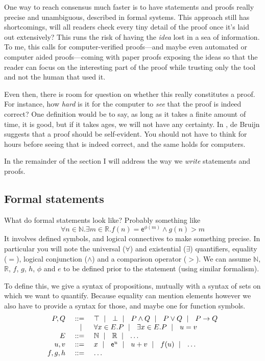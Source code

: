 One way to reach consensus much faster is to have statements and proofs really
precise and unambiguous, described in formal systems. This approach still has
shortcomings, will all readers check every tiny detail of the proof once it's
laid out extensively? This runs the risk of having the \emph{idea} lost in a
sea of information.
To me, this calls for computer-verified proofs---and maybe even automated or
computer aided proofs---coming with paper proofs exposing the ideas
so that the reader can focus on the interesting part of
the proof while trusting only the tool and not the human that used it.

Even then, there is room for question on whether this really constitutes a
proof.
For instance, how \emph{hard} is it for the computer to \emph{see} that the
proof is indeed correct? One definition would be to say, as long as it takes
a finite amount of time, it is good, but if it takes ages, we will not have any
certainty. In , de Bruijn suggests that a proof should be
self-evident. You should not have to think for hours before seeing that is
indeed correct, and the same holds for computers.

In the remainder of the section I will address the way we \emph{write}
statements and proofs.

\subsection{Formal statements}

What do formal statements look like? Probably something like
\[
  \forall n \in \mathbb{N}. \exists m \in \mathbb{R}.
  f(n) = \mathsf{e}^{\phi(m)} \wedge g(n) > m
\]
It involves defined symbols, and logical connectives to make something precise.
In particular you will note the universal (\(\forall\)) and existential
(\(\exists\)) quantifiers, equality (\(=\)), logical conjunction (\(\wedge\))
and a comparison operator (\(>\)).
We can assume \(\mathbb{N}\), \(\mathbb{R}\), \(f\), \(g\), \(h\), \(\phi\) and
\(e\) to be defined prior to the statement (using similar formalism).

To define this, we give a syntax of propositions, mutually with a syntax of
sets on which we want to quantify. Because equality can mention elements however
we also have to provide a syntax for those, and maybe one for function symbols.
\[
  \begin{array}{rrl}
    P, Q &\ \mathrel{{:}{:}{=}}\ & \top \ \mid\ \  \bot \ \mid\ \  P \wedge Q \ \mid\ \  P \vee Q
    \ \mid\ \  P \to Q \\
    &\ \mid\ \ & \forall x \in E. P \ \mid\ \  \exists x \in E. P \ \mid\ \  u = v \\
    E &\ \mathrel{{:}{:}{=}}\ & \mathbb{N} \ \mid\ \  \mathbb{R} \ \mid\ \  \dots \\
    u, v &\ \mathrel{{:}{:}{=}}\ & x \ \mid\ \  \mathsf{e}^u \ \mid\ \  u + v \ \mid\ \  f(u) \ \mid\ \  \dots \\
    f, g, h &\ \mathrel{{:}{:}{=}}\ & \dots
  \end{array}
\]


